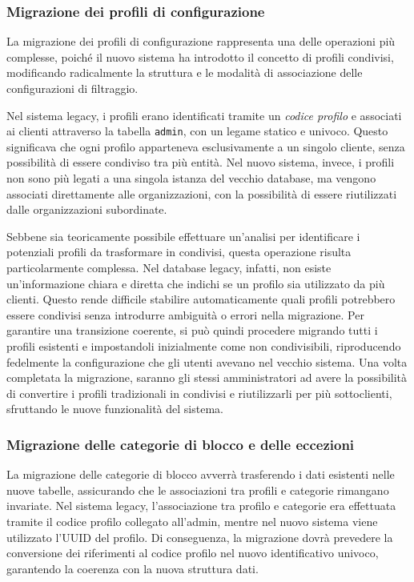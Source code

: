 \subsubsection{Migrazione dei profili di configurazione}
La migrazione dei profili di configurazione rappresenta una delle operazioni più complesse, poiché il nuovo sistema ha introdotto il concetto di profili condivisi, modificando radicalmente la struttura e le modalità di associazione delle configurazioni di filtraggio.

Nel sistema legacy, i profili erano identificati tramite un \textit{codice profilo} e associati ai clienti attraverso la tabella \texttt{admin}, con un legame statico e univoco. Questo significava che ogni profilo apparteneva esclusivamente a un singolo cliente, senza possibilità di essere condiviso tra più entità. Nel nuovo sistema, invece, i profili non sono più legati a una singola istanza del vecchio database, ma vengono associati direttamente alle organizzazioni, con la possibilità di essere riutilizzati dalle organizzazioni subordinate.

Sebbene sia teoricamente possibile effettuare un'analisi per identificare i potenziali profili da trasformare in condivisi, questa operazione risulta particolarmente complessa. Nel database legacy, infatti, non esiste un'informazione chiara e diretta che indichi se un profilo sia utilizzato da più clienti. Questo rende difficile stabilire automaticamente quali profili potrebbero essere condivisi senza introdurre ambiguità o errori nella migrazione.
%
Per garantire una transizione coerente, si può quindi procedere migrando tutti i profili esistenti e impostandoli inizialmente come non condivisibili, riproducendo fedelmente la configurazione che gli utenti avevano nel vecchio sistema. Una volta completata la migrazione, saranno gli stessi amministratori ad avere la possibilità di convertire i profili tradizionali in condivisi e riutilizzarli per più sottoclienti, sfruttando le nuove funzionalità del sistema.

\subsubsection{Migrazione delle categorie di blocco e delle eccezioni}
La migrazione delle categorie di blocco avverrà trasferendo i dati esistenti nelle nuove tabelle, assicurando che le associazioni tra profili e categorie rimangano invariate. Nel sistema legacy, l'associazione tra profilo e categorie era effettuata tramite il codice profilo collegato all'admin, mentre nel nuovo sistema viene utilizzato l'UUID del profilo. Di conseguenza, la migrazione dovrà prevedere la conversione dei riferimenti al codice profilo nel nuovo identificativo univoco, garantendo la coerenza con la nuova struttura dati.

